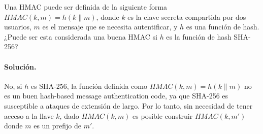 Una HMAC puede ser definida de la siguiente forma $\textit{HMAC}(k, m) = h(k \|
m)$, donde $k$ es la clave secreta compartida por dos usuarios, $m$ es el
mensaje que se necesita autentificar, y $h$ es una función de
hash. ¿Puede ser esta considerada una buena HMAC si $h$ es la función de
hash SHA-256?

\paragraph{Solución.} No, si $h$ es SHA-256, la función definida como $\textit{HMAC}(k,m)=h(k\|m)$ no es un buen hash-based message authentication code, ya que SHA-256 es susceptible a ataques de extensión de largo. Por lo tanto, sin necesidad de tener acceso a la llave $k$, dado $\textit{HMAC}(k,m)$ es posible construir $\textit{HMAC}(k,m')$ donde $m$ es un prefijo de $m'$.
